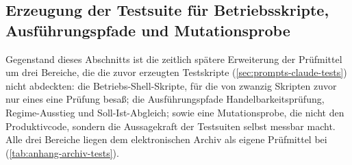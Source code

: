 \subsection{Erzeugung der Testsuite für Betriebsskripte, Ausführungspfade und
Mutationsprobe}
\label{sec:prompts-claude-testsuite}

Gegenstand dieses Abschnitts ist die zeitlich spätere Erweiterung der
Prüfmittel um drei Bereiche, die die zuvor erzeugten Testskripte
(\cref{sec:prompts-claude-tests}) nicht abdeckten: die Betriebs-Shell-Skripte,
für die von zwanzig Skripten zuvor nur eines eine Prüfung besaß; die
Ausführungspfade Handelbarkeitsprüfung, Regime-Ausstieg und
Soll-Ist-Abgleich; sowie eine Mutationsprobe, die nicht den Produktivcode,
sondern die Aussagekraft der Testsuiten selbst messbar macht. Alle drei
Bereiche liegen dem elektronischen Archiv als eigene Prüfmittel bei
(\cref{tab:anhang-archiv-tests}).

